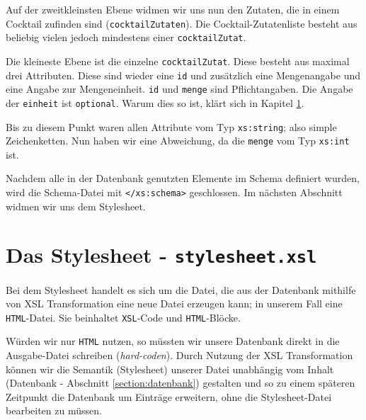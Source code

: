






Auf der zweitkleinsten Ebene widmen wir uns nun den Zutaten, die in einem Cocktail zufinden sind (\texttt{cocktailZutaten}). Die Cocktail-Zutatenliste besteht aus beliebig vielen jedoch mindestens einer \texttt{cocktailZutat}.








Die kleineste Ebene ist die einzelne \texttt{cocktailZutat}. Diese besteht aus maximal drei Attributen. Diese sind wieder eine \texttt{id} und zusätzlich eine Mengenangabe und eine Angabe zur Mengeneinheit. \texttt{id} und \texttt{menge} sind Pflichtangaben. Die Angabe der \texttt{einheit} ist \texttt{optional}. Warum dies so ist, klärt sich in Kapitel \ref{section:stylesheet}.

Bis zu diesem Punkt waren allen Attribute vom Typ \texttt{xs:string}; also simple Zeichenketten. Nun haben wir eine Abweichung, da die \texttt{menge} vom Typ \texttt{xs:int} ist.



Nachdem alle in der Datenbank genutzten Elemente im Schema definiert wurden, wird die Schema-Datei mit \texttt{</xs:schema>} geschlossen. Im nächsten Abschnitt widmen wir uns dem Stylesheet.





\section{Das Stylesheet - \texttt{stylesheet.xsl}}
\label{section:stylesheet}

Bei dem Stylesheet handelt es sich um die Datei, die aus der Datenbank mithilfe von XSL Transformation eine neue Datei erzeugen kann; in unserem Fall eine \texttt{HTML}-Datei. Sie beinhaltet \texttt{XSL}-Code und \texttt{HTML}-Blöcke. 

Würden wir nur \texttt{HTML} nutzen, so müssten wir unsere Datenbank direkt in die Ausgabe-Datei schreiben (\textit{hard-coden}). Durch Nutzung der XSL Transformation können wir die Semantik (Stylesheet) unserer Datei unabhängig vom Inhalt (Datenbank - Abschnitt \ref{section:datenbank}) gestalten und so zu einem späteren Zeitpunkt die Datenbank um Einträge erweitern, ohne die Stylesheet-Datei bearbeiten zu müssen.

